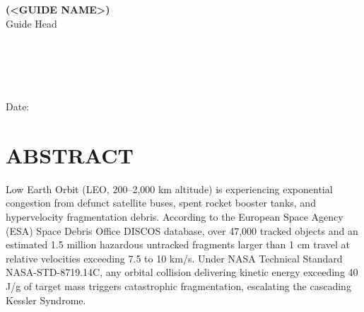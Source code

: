 \documentclass[12pt]{report}
\begin{document}
\begin{titlepage}
    \vspace*{0.3in}
    \hspace*{0.2in} {\bf (<GUIDE NAME>) } \hspace*{1.5in}{\bf (Dr. Sarika Zaware / Dr. K.S. Wagh)}\\
    \hspace*{0.5in}Guide \hspace*{3.0 in} Head\\
    \hspace*{0.0in}{Dept. of AIDS / Computer Engg.} \hspace*{0.9 in}{Dept. of AIDS / Computer Engg.}\\
    \vspace*{0.2in}\\
    \hspace*{0.5in}{AISSMS Institute of Information Technology, Pune-411001}\\
    \vspace*{0.1in}\\
    \hspace*{0.2in}{Place: PUNE}\\
    \hspace*{0.2in}Date:
\end{titlepage}


\chapter*{ABSTRACT}
Low Earth Orbit (LEO, 200--2,000 km altitude) is experiencing exponential congestion from defunct satellite buses, spent rocket booster tanks, and hypervelocity fragmentation debris. According to the European Space Agency (ESA) Space Debris Office DISCOS database, over 47,000 tracked objects and an estimated 1.5 million hazardous untracked fragments larger than 1 cm travel at relative velocities exceeding 7.5 to 10 km/s. Under NASA Technical Standard NASA-STD-8719.14C, any orbital collision delivering kinetic energy exceeding 40 J/g of target mass triggers catastrophic fragmentation, escalating the cascading Kessler Syndrome.
\end{document}
